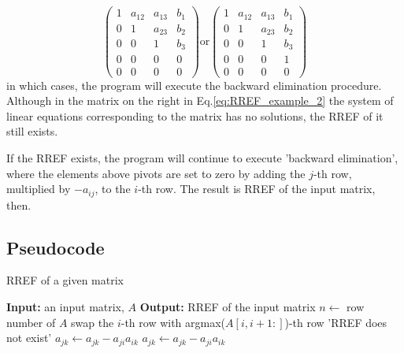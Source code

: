 \documentclass{article}
\begin{document}
\begin{equation}
\label{eq:RREF_example_2}
    \begin{pmatrix}
    1 & a_{12} & a_{13} & b_1 \\
    0 & 1 & a_{23} & b_2 \\
    0 & 0 & 1 & b_3 \\
    0 & 0 & 0 & 0\\
    0 & 0 & 0 & 0
    \end{pmatrix}
    \mbox{or}
    \begin{pmatrix}
    1 & a_{12} & a_{13} & b_1 \\
    0 & 1 & a_{23} & b_2 \\
    0 & 0 & 1 & b_3 \\
    0 & 0 & 0 & 1\\
    0 & 0 & 0 & 0
    \end{pmatrix}
\end{equation}
in which cases, the program will execute the backward elimination procedure. Although in the matrix on the right in Eq.\ref{eq:RREF_example_2} the system of linear equations corresponding to the matrix has no solutions, the RREF of it still exists.
\par
If the RREF exists, the program will continue to execute 'backward elimination', where the elements above pivots are set to zero by adding the $j$-th row, multiplied by $-a_{ij}$, to the $i$-th row. The result is RREF of the input matrix, then.

\subsection{Pseudocode}
\begin{algorithm}[H]%
\caption{RREF of a given matrix}
    \begin{algorithmic}[1]%
        \Statex\textbf{Input:} an input matrix, $A$
        \Statex\textbf{Output:} RREF of the input matrix
        \State $n\gets$ row number of $A$
                \State swap the $i$-th row with argmax($A[i, i+1:]$)-th row
                    \Return 'RREF does not exist'
                \EndIf
            \EndIf
                    \State $a_{jk}\gets a_{jk}-a_{ji}a_{ik}$
                \EndFor
            \EndFor
        \EndFor
                  \State $a_{jk}\gets a_{jk}-a_{ji}a_{ik}$
                \EndFor
            \EndFor
        \EndFor
    \end{algorithmic}
\end{algorithm}
\end{document}
